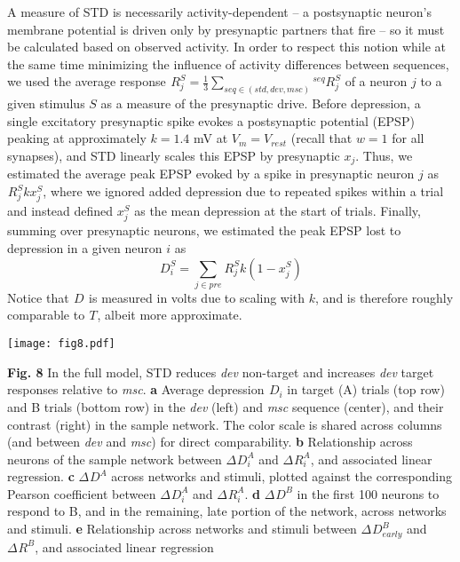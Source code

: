 \documentclass[pdflatex,referee,iicol,sn-basic]{sn-jnl}
\newcommand{\dev}{\textit{dev}}
\newcommand{\msc}{\textit{msc}}
\renewcommand{\R}[3][]{{}^{#1}_{}\!R^{#2}_{#3}}
\renewcommand{\T}[3][]{{}^{#1}_{}T^{#2}_{#3}}
\newcommand{\D}[3][]{{}^{#1}_{}\!D^{#2}_{#3}}
\theoremstyle{thmstyleone}%
\theoremstyle{thmstyletwo}%
\theoremstyle{thmstylethree}%
\begin{document}
A measure of STD is necessarily activity-dependent -- a postsynaptic neuron's membrane potential is driven only by presynaptic partners that fire -- so it must be calculated based on observed activity. In order to respect this notion while at the same time minimizing the influence of activity differences between sequences, we used the average response $\R{S}{j} = \frac{1}{3} \sum_{seq \in (std, dev, msc)} \R[seq]{S}{j}$ of a neuron $j$ to a given stimulus $S$ as a measure of the presynaptic drive. Before depression, a single excitatory presynaptic spike evokes a postsynaptic potential (EPSP) peaking at approximately $k = 1.4$ mV at $V_m = V_{rest}$ (recall that $w = 1$ for all synapses), and STD linearly scales this EPSP by presynaptic $x_j$. Thus, we estimated the average peak EPSP evoked by a spike in presynaptic neuron $j$ as $\R{S}{j} k x_j^S$, where we ignored added depression due to repeated spikes within a trial and instead defined $x_j^S$ as the mean depression at the start of trials. Finally, summing over presynaptic neurons, we estimated the peak EPSP lost to depression in a given neuron $i$ as
\begin{equation}
    \D{S}{i} = \sum_{j \in pre} \R{S}{j} k (1-x_j^S) \label{eqn-D}
\end{equation}
Notice that $\D{}{}$ is measured in volts due to scaling with $k$, and is therefore roughly comparable to $\T{}{}$, albeit more approximate.

\begin{figure*}%
    \centering
    \texttt{[image: fig8.pdf]}
    \caption{}
    \label{fig8}
\end{figure*}
\textbf{Fig. 8} In the full model, STD reduces \dev{} non-target and increases \dev{} target responses relative to \msc{}.
\textbf{a} Average depression $\D{}{i}$ in target (A) trials (top row) and B trials (bottom row) in the \dev{} (left) and \msc{} sequence (center), and their contrast (right) in the sample network. The color scale is shared across columns (and between \dev{} and \msc{}) for direct comparability.
\textbf{b} Relationship across neurons of the sample network between $\Delta \D{A}{i}$ and $\Delta \R{A}{i}$, and associated linear regression.
\textbf{c} $\Delta \D{A}{}$ across networks and stimuli, plotted against the corresponding Pearson coefficient between $\Delta \D{A}{i}$ and $\Delta \R{A}{i}$.
\textbf{d} $\Delta \D{B}{}$ in the first 100 neurons to respond to B, and in the remaining, late portion of the network, across networks and stimuli.
\textbf{e} Relationship across networks and stimuli between $\Delta \D{B}{early}$ and $\Delta \R{B}{}$, and associated linear regression
\end{document}
